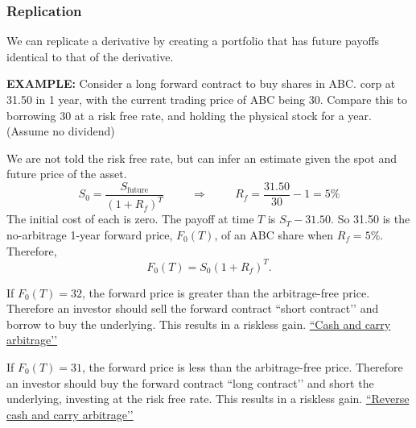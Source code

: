 \documentclass[../notes_compiled.tex]{subfiles}
\begin{document}
\subsubsection*{Replication}
\begin{itemize}
\item We can replicate a derivative by creating a portfolio that has future payoffs identical to that of the derivative. 
{\color{RedViolet}
\item[] \textbf{EXAMPLE:} Consider a long forward contract to buy shares in ABC. corp at 31.50 in 1 year, with the current trading price of ABC being 30. Compare this to borrowing 30 at a risk free rate, and holding the physical stock for a year. (Assume no dividend)
}
{\color{RoyalBlue}
\item[] We are not told the risk free rate, but can infer an estimate given the spot and future price of the asset.
\begin{equation*}
S_{0} = \frac{S_{\text{future}}}{(1+R_{f})^{T}} \hspace{1cm}\Rightarrow \hspace{1cm}R_{f} = \frac{31.50}{30} -1 = 5\%
\end{equation*}
The initial cost of each is zero. The payoff at time $T$ is $S_{T}-31.50$. So 31.50 is the no-arbitrage 1-year forward price, $F_{0}(T)$, of an ABC share when $R_{f} = 5\%$. Therefore,
\begin{equation*}
F_{0}(T) = S_{0}(1+R_{f})^{T}.
\end{equation*} 
\item[] If $F_{0}(T) = 32$, the forward price is greater than the arbitrage-free price. Therefore an investor should sell the forward contract ``short contract’’ and borrow to buy the underlying. This results in a riskless gain. \underline{``Cash and carry arbitrage’’}
\item[] If $F_{0}(T) = 31$, the forward price is less than the arbitrage-free price. Therefore an investor should buy the forward contract ``long contract’’ and short the underlying, investing at the risk free rate. This results in a riskless gain. \underline{``Reverse cash and carry arbitrage’’}
}
\end{itemize}
\end{document}
